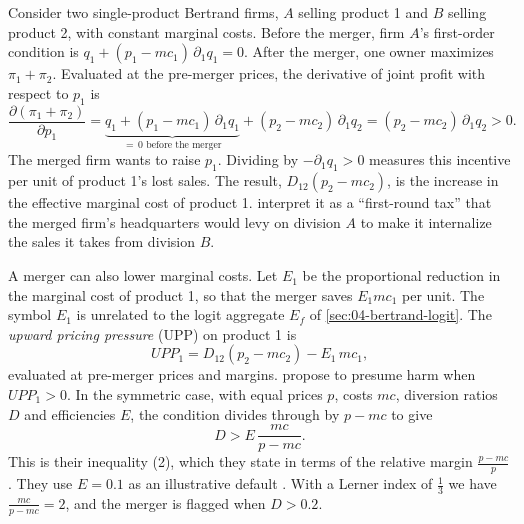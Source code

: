Consider two single-product Bertrand firms, $A$ selling product 1 and $B$ selling product 2, with constant
marginal costs. Before the merger, firm $A$'s first-order condition is
$q_1 + (p_1 - mc_1)\,\partial_1 q_1 = 0$. After the merger, one owner maximizes $\pi_1 + \pi_2$. Evaluated at
the pre-merger prices, the derivative of joint profit with respect to $p_1$ is
\[
  \frac{\partial(\pi_1 + \pi_2)}{\partial p_1}
  = \underbrace{q_1 + (p_1 - mc_1)\,\partial_1 q_1}_{=\,0 \text{ before the merger}} + (p_2 - mc_2)\,\partial_1 q_2
  = (p_2 - mc_2)\,\partial_1 q_2 > 0.
\]
The merged firm wants to raise $p_1$. Dividing by $-\partial_1 q_1 > 0$ measures this incentive per unit of
product 1's lost sales. The result, $D_{12}(p_2 - mc_2)$, is the increase in the effective marginal cost of
product 1. \citet[p.~9]{FarrellShapiro2010} interpret it as a ``first-round tax'' that the merged firm's
headquarters would levy on division $A$ to make it internalize the sales it takes from division $B$.

A merger can also lower marginal costs. Let $E_1$ be the proportional reduction in the marginal cost of product
1, so that the merger saves $E_1 mc_1$ per unit. The symbol $E_1$ is unrelated to the logit aggregate $E_f$ of
\cref{sec:04-bertrand-logit}. The \emph{upward pricing pressure} (UPP) on product 1 is
\begin{equation}\label{eq:04-upp}
  \mathit{UPP}_1 = D_{12}(p_2 - mc_2) - E_1\,mc_1,
\end{equation}
evaluated at pre-merger prices and margins. \citet[p.~12, inequality (1)]{FarrellShapiro2010} propose to
presume harm when $\mathit{UPP}_1 > 0$. In the symmetric case, with equal prices $p$, costs $mc$, diversion
ratios $D$ and efficiencies $E$, the condition divides through by $p - mc$ to give
\[
  D > E\,\frac{mc}{p - mc}.
\]
This is their inequality (2), which they state in terms of the relative margin $\frac{p - mc}{p}$. They use $E = 0.1$ as an illustrative default
\citep[p.~10]{FarrellShapiro2010}. With a Lerner index of $\frac{1}{3}$ we have $\frac{mc}{p - mc} = 2$, and the
merger is flagged when $D > 0.2$.


